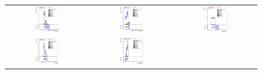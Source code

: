 \clearpage
\begin{figure}[htbp]
\begin{center}
\begin{tabular}{ccc}
%
\includegraphics[width=0.30\textwidth]{appendices/figures/sdrs/JetPtB1_ELEMUONCR1_1W_NOMINAL.eps}  &
\includegraphics[width=0.30\textwidth]{appendices/figures/sdrs/JetPtB2_ELEMUONCR1_1W_NOMINAL.eps} &
\includegraphics[width=0.30\textwidth]{appendices/figures/sdrs/nWhad_ELEMUONCR1_1W_NOMINAL_logscale.eps} \\
\includegraphics[width=0.30\textwidth]{appendices/figures/sdrs/VLQAna_WbX_W1Pt_ELEMUONCR1_1W_NOMINAL.eps} &
\includegraphics[width=0.30\textwidth]{appendices/figures/sdrs/VLQAna_WbX_DRLepMet_ELEMUONCR1_1W_NOMINAL.eps} &

\end{tabular}
\end{center}
\end{figure}
